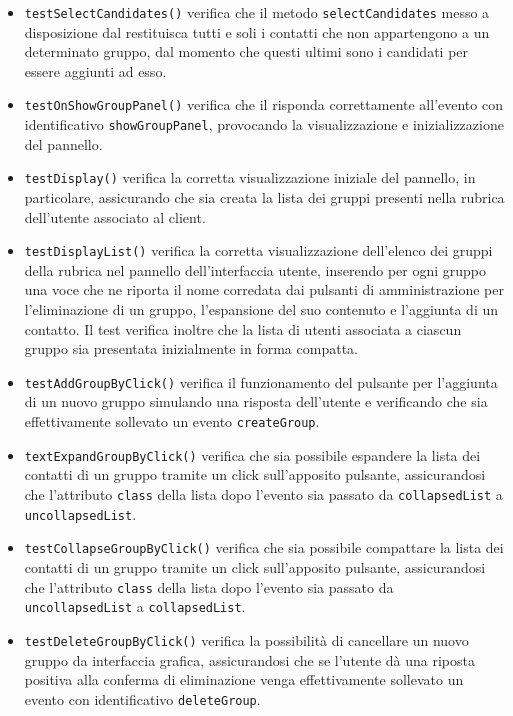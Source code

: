 \begin{itemize}
\begin{itemize}
\item \texttt{testSelectCandidates()} verifica che il metodo \verb'selectCandidates' messo a disposizione dal  restituisca tutti e soli i contatti che non appartengono a un determinato gruppo, dal momento che questi ultimi sono i candidati per essere aggiunti ad esso.

\item \texttt{testOnShowGroupPanel()} verifica che il  risponda correttamente all'evento con identificativo \verb'showGroupPanel', provocando la visualizzazione e inizializzazione del pannello.

\item \texttt{testDisplay()} verifica la corretta visualizzazione iniziale del pannello, in particolare, assicurando che sia creata la lista dei gruppi presenti nella rubrica dell'utente associato al client.

\item \texttt{testDisplayList()} verifica la corretta visualizzazione dell'elenco dei gruppi della rubrica nel pannello dell'interfaccia utente, inserendo per ogni gruppo una voce che ne riporta il nome corredata dai pulsanti di amministrazione per l'eliminazione di un gruppo, l'espansione del suo contenuto e l'aggiunta di un contatto. Il test verifica inoltre che la lista di utenti associata a ciascun gruppo sia presentata inizialmente in forma compatta.

\item \texttt{testAddGroupByClick()} verifica il funzionamento del pulsante per l'aggiunta di un nuovo gruppo simulando una risposta dell'utente e verificando che sia effettivamente sollevato un evento \verb'createGroup'.

\item \texttt{textExpandGroupByClick()}  verifica che sia possibile espandere la lista dei contatti di un gruppo tramite un click sull'apposito pulsante, assicurandosi che l'attributo \verb'class' della lista dopo l'evento sia passato da \verb'collapsedList' a \verb'uncollapsedList'.

\item \texttt{testCollapseGroupByClick()}  verifica che sia possibile compattare la lista dei contatti di un gruppo tramite un click sull'apposito pulsante, assicurandosi che l'attributo \verb'class' della lista dopo l'evento sia passato da \verb'uncollapsedList' a \verb'collapsedList'.

\item \texttt{testDeleteGroupByClick()} verifica la possibilità di cancellare un nuovo gruppo da interfaccia grafica, assicurandosi che se l'utente dà una riposta positiva alla conferma di eliminazione venga effettivamente sollevato un evento con identificativo \verb'deleteGroup'.


\end{itemize}
\end{itemize}
